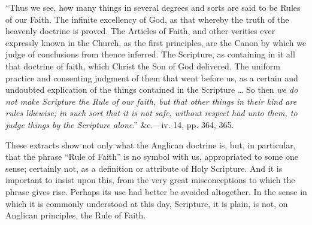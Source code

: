 ``Thus we
see, how many things in several degrees and sorts are said to be Rules
of our Faith. The infinite excellency of God, as that whereby the truth
of the heavenly doctrine is proved. The Articles of Faith, and other
verities ever expressly known in the Church, as the first principles,
are the Canon by which we judge of conclusions from thence inferred. The
Scripture, as containing in it all that doctrine of faith, which Christ
the Son of God delivered. The uniform practice and consenting judgment
of them that went before us, as a certain and undoubted explication of
the things contained in the Scripture … So then \emph{we do not make
Scripture the Rule of our faith, but that other things in their kind are
rules likewise; in such sort that it is not safe, without respect had
unto them, to judge things by the Scripture alone}.'' \&c.—iv.
14, pp. 364, 365.

These
extracts show not only what the Anglican doctrine is, but, in
particular, that the phrase ``Rule of Faith'' is no symbol with us,
appropriated to some one sense; certainly not, as a definition or
attribute of Holy Scripture. And it is important to insist upon this,
from the very great misconceptions to which the phrase gives rise.
Perhaps its use had better be avoided altogether. In the sense in which
it is commonly understood at this day, Scripture, it is plain, is not,
on Anglican principles, the Rule of Faith.

